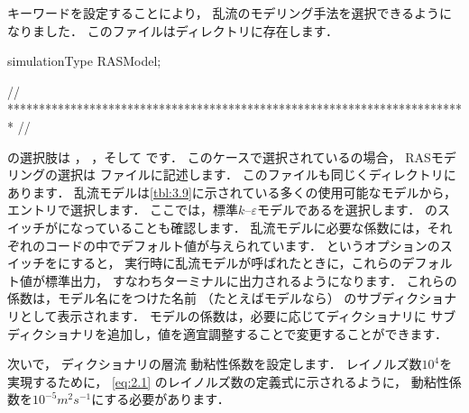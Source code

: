 %
%
キーワードを設定することにより，
乱流のモデリング手法を選択できるようになりました．
このファイルはディレクトリに存在します．
\begin{OFverbatim}[file, linenum=17]

simulationType  RASModel;


// ************************************************************************* //
\end{OFverbatim}
の選択肢は
%
%
，
%
%
，そして
%
%
です．
このケースで選択されているの場合，
RASモデリングの選択は
%
%
ファイルに記述します．
このファイルも同じくディレクトリにあります．
乱流モデルは\autoref{tbl:3.9}に示されている多くの使用可能なモデルから，
エントリで選択します．
ここでは，標準$k$--$\varepsilon$モデルであるを選択します．
のスイッチがになっていることも確認します．
乱流モデルに必要な係数には，それぞれのコードの中でデフォルト値が与えられています．
%
%
というオプションのスイッチをにすると，
実行時に乱流モデルが呼ばれたときに，これらのデフォルト値が標準出力，
すなわちターミナルに出力されるようになります．
これらの係数は，モデル名にをつけた名前
（たとえばモデルなら）
のサブディクショナリとして表示されます．
モデルの係数は，必要に応じてディクショナリに
サブディクショナリを追加し，値を適宜調整することで変更することができます．

次いで，
%
%
ディクショナリの層流
%
動粘性係数を設定します．
レイノルズ数$10^{4}$を実現するために，
\autoref{eq:2.1} のレイノルズ数の定義式に示されるように，
動粘性係数を$10^{-5}\unit{m^{2}s^{-1}}$にする必要があります．

